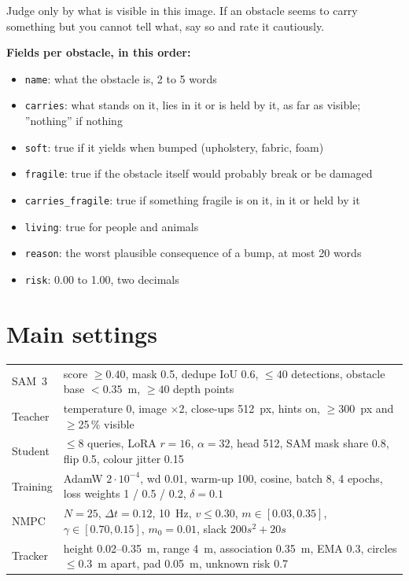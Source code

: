 \documentclass[10pt,a4paper]{article}
\begin{document}
\begin{footnotesize}
Judge only by what is visible in this image. If an obstacle seems to carry something but you cannot tell what, say so and rate it cautiously.

\textbf{Fields per obstacle, in this order:}
\begin{itemize}
\item \texttt{name}: what the obstacle is, 2 to 5 words
\item \texttt{carries}: what stands on it, lies in it or is held by it, as far as visible; ''nothing'' if nothing
\item \texttt{soft}: true if it yields when bumped (upholstery, fabric, foam)
\item \texttt{fragile}: true if the obstacle itself would probably break or be damaged
\item \texttt{carries\_fragile}: true if something fragile is on it, in it or held by it
\item \texttt{living}: true for people and animals
\item \texttt{reason}: the worst plausible consequence of a bump, at most 20 words
\item \texttt{risk}: 0.00 to 1.00, two decimals
\end{itemize}
\end{footnotesize}

\section{Main settings}
\begin{center}\footnotesize
\begin{tabular}{ll}
\toprule
SAM~3 & score $\geq0.40$, mask 0.5, dedupe IoU 0.6, $\leq40$ detections, obstacle base $<0.35$~m, $\geq40$ depth points \\
Teacher & temperature 0, image $\times$2, close-ups 512~px, hints on, $\geq$300~px and $\geq$25\,\% visible \\
Student & $\leq$8 queries, LoRA $r=16$, $\alpha=32$, head 512, SAM mask share 0.8, flip 0.5, colour jitter 0.15 \\
Training & AdamW $2\cdot10^{-4}$, wd 0.01, warm-up 100, cosine, batch 8, 4 epochs, loss weights 1 / 0.5 / 0.2, $\delta=0.1$ \\
NMPC & $N=25$, $\Delta t=0.12$, 10~Hz, $v\leq0.30$, $m\in[0.03,0.35]$, $\gamma\in[0.70,0.15]$, $m_0=0.01$, slack $200s^2+20s$ \\
Tracker & height 0.02--0.35~m, range 4~m, association 0.35~m, EMA 0.3, circles $\leq0.3$~m apart, pad 0.05~m, unknown risk 0.7 \\
\bottomrule
\end{tabular}
\end{center}
\end{document}
